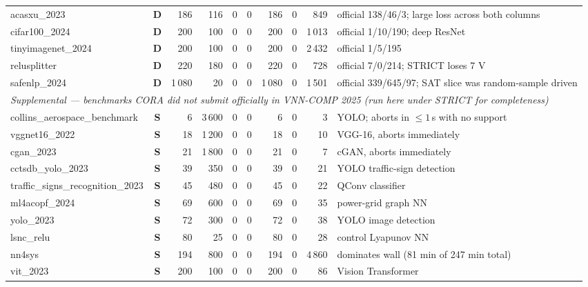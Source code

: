 \documentclass[10pt]{beamer}
\newcommand{\sdone}{{\color{cdone}\textbf{D}}}
\newcommand{\snotsub}{{\color{csup}\textbf{S}}}
\begin{document}
\begin{frame}[fragile]
\begin{tabular}{l c r r r r r r r l}
acasxu\_2023                     & \sdone & 186    & 116    & 0           & 0           & 186   & 0 & 849    & official 138/46/3; large loss across both columns \\
cifar100\_2024                   & \sdone & 200    & 100    & 0           & 0           & 200   & 0 & 1\,013 & official 1/10/190; deep ResNet \\
tinyimagenet\_2024               & \sdone & 200    & 100    & 0           & 0           & 200   & 0 & 2\,432 & official 1/5/195 \\
relusplitter                     & \sdone & 220    & 180    & 0           & 0           & 220   & 0 & 728    & official 7/0/214; STRICT loses 7 V \\
safenlp\_2024                    & \sdone & 1\,080 & 20     & 0           & 0           & 1\,080 & 0 & 1\,501 & official 339/645/97; SAT slice was random-sample driven \\
\midrule
\multicolumn{10}{l}{\textit{Supplemental --- benchmarks CORA did \emph{not} submit officially in VNN-COMP 2025 (run here under STRICT for completeness)}} \\
collins\_aerospace\_benchmark    & \snotsub & 6   & 3\,600 & 0 & 0 & 6   & 0 & 3     & YOLO; aborts in ${\le}1$\,s with no support \\
vggnet16\_2022                   & \snotsub & 18  & 1\,200 & 0 & 0 & 18  & 0 & 10    & VGG-16, aborts immediately \\
cgan\_2023                       & \snotsub & 21  & 1\,800 & 0 & 0 & 21  & 0 & 7     & cGAN, aborts immediately \\
cctsdb\_yolo\_2023               & \snotsub & 39  & 350    & 0 & 0 & 39  & 0 & 21    & YOLO traffic-sign detection \\
traffic\_signs\_recognition\_2023& \snotsub & 45  & 480    & 0 & 0 & 45  & 0 & 22    & QConv classifier \\
ml4acopf\_2024                   & \snotsub & 69  & 600    & 0 & 0 & 69  & 0 & 35    & power-grid graph NN \\
yolo\_2023                       & \snotsub & 72  & 300    & 0 & 0 & 72  & 0 & 38    & YOLO image detection \\
lsnc\_relu                       & \snotsub & 80  & 25     & 0 & 0 & 80  & 0 & 28    & control Lyapunov NN \\
nn4sys                           & \snotsub & 194 & 800    & 0 & 0 & 194 & 0 & 4\,860 & dominates wall (81 min of 247 min total) \\
vit\_2023                        & \snotsub & 200 & 100    & 0 & 0 & 200 & 0 & 86    & Vision Transformer \\
\bottomrule
\end{tabular}


\end{frame}
\end{document}
